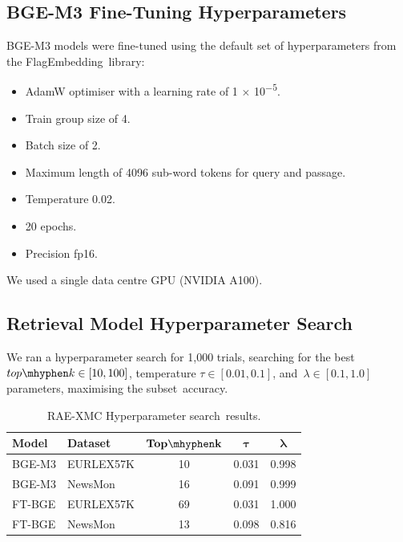 \documentclass[make,article,accept,pdftex,moreauthors]{Definitions/mdpi}
\begin{document}
\subsection[\appendixname~\thesubsection]{BGE-M3 Fine-Tuning Hyperparameters}
\label{subsec:hyper_parameters_bge_m3}
BGE-M3 models were fine-tuned using the default set of hyperparameters from the FlagEmbedding~library:
\begin{itemize}\itemsep=0pt
  \item AdamW optimiser with a learning rate of 1 $\times$ 10\textsuperscript{$-5$}.
  \item Train group size of 4.
  \item Batch size of 2.
  \item Maximum length of 4096 sub-word tokens for query and passage.
  \item Temperature 0.02.
  \item 20 epochs.
  \item Precision fp16.
\end{itemize}

We used a single data centre GPU (NVIDIA A100).

\subsection[\appendixname~\thesubsection]{Retrieval Model Hyperparameter Search}
\label{subsec:hyper_parameter_search}

We ran a hyperparameter search for 1,000 trials, searching for the best $top\mhyphen k \in [10, 100]$, temperature $\tau \in [0.01, 0.1]$, and~$\lambda \in [0.1, 1.0]$ parameters, maximising the subset~accuracy.

\begin{table}[H]
    \caption{RAE-XMC Hyperparameter search~results.}
    \begin{tabularx}{\textwidth}{L L CCC}
        \toprule
        \textbf{Model} & \textbf{Dataset} & \(\mathbf{Top\mhyphen k}\) & \(\boldsymbol{\tau}\) & \(\boldsymbol{\lambda}\) \\
        \midrule
       
        BGE-M3 & EURLEX57K & 10 & 0.031 & 0.998 \\
        BGE-M3 & NewsMon & 16 & 0.091 & 0.999 \\
        \midrule
        FT-BGE & EURLEX57K & 69 & 0.031 & 1.000 \\
        FT-BGE & NewsMon & 13 & 0.098 & 0.816 \\
        \bottomrule
    \end{tabularx}
\end{table}
\end{document}
